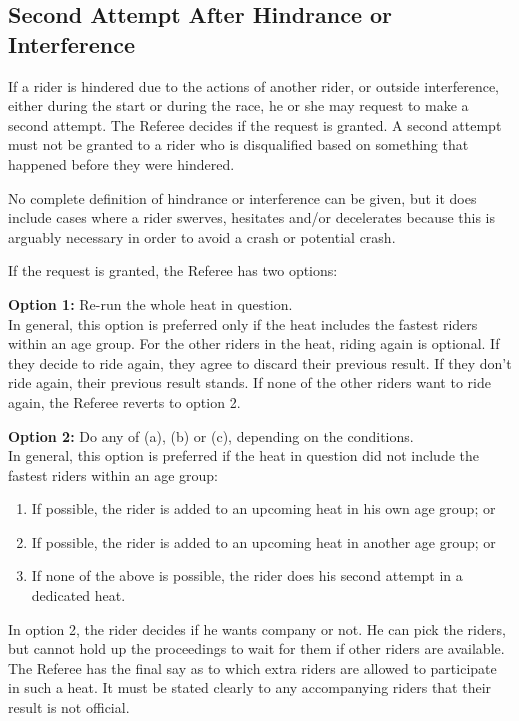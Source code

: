 \subsection{Second Attempt After Hindrance or Interference}

If a rider is hindered due to the actions of another rider, or outside interference, either during the start or during the race, he or she may request to make a second attempt.
The Referee decides if the request is granted.
A second attempt must not be granted to a rider who is disqualified based on something that happened before they were hindered.

No complete definition of hindrance or interference can be given, but it does include cases where a rider swerves, hesitates and/or decelerates because this is arguably necessary in order to avoid a crash or potential crash.

If the request is granted, the Referee has two options:

\textbf{Option 1:}
Re-run the whole heat in question.\\
In general, this option is preferred only if the heat includes the fastest riders within an age group.
For the other riders in the heat, riding again is optional.
If they decide to ride again, they agree to discard their previous result.
If they don't ride again, their previous result stands.
If none of the other riders want to ride again, the Referee reverts to option 2.

\textbf{Option 2:}
Do any of (a), (b) or (c), depending on the conditions.\\
In general, this option is preferred if the heat in question did not include the fastest riders within an age group:
\begin{enumerate}[label=(\alph*)]
\item If possible, the rider is added to an upcoming heat in his own age group; or
\item If possible, the rider is added to an upcoming heat in another age group; or
\item If none of the above is possible, the rider does his second attempt in a dedicated heat.
\end{enumerate}
In option 2, the rider decides if he wants company or not.
He can pick the riders, but cannot hold up the proceedings to wait for them if other riders are available.
The Referee has the final say as to which extra riders are allowed to participate in such a heat.
It must be stated clearly to any accompanying riders that their result is not official.

